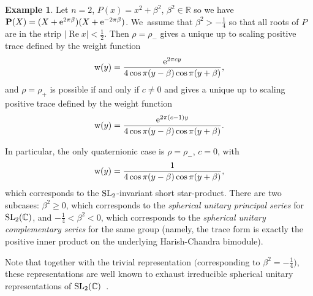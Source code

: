 \documentclass[pdftex]{sigma}
\renewcommand{\Re}{\operatorname{Re}}
\theoremstyle{definition}
\newtheorem{Example}[Theorem]{Example}
\numberwithin{equation}{section}
\begin{document}
\begin{Example}\label{neq2} Let $n=2$, $P(x)=x^2+\beta^2$, $\beta^2\in \mathbb R$ so we have $\mathbf{P}(X)=(X+{\rm e}^{2\pi\beta})(X+{\rm e}^{-2\pi\beta})$. We~assume that $\beta^2>-\frac{1}{4}$ so that all roots of $P$ are in the strip $|\Re x|<\frac12$. Then $\rho=\rho_-$ gives a unique up to scaling positive trace defined by the weight function
\[
{\rm w}(y)=\frac{{\rm e}^{2\pi cy}}{4\cos \pi(y-\beta)\cos \pi(y+\beta)},
\]
and $\rho=\rho_+$ is possible if and only if $c\ne 0$ and gives a unique up to scaling positive trace defined by the weight function
\[
{\rm w}(y)=\frac{{\rm e}^{2\pi(c-1)y}}{4\cos \pi(y-\beta)\cos \pi(y+\beta)}.
\]

In particular, the only quaternionic case is $\rho=\rho_-$, $c=0$, with
\[
{\rm w}(y)=\frac{1}{4\cos \pi(y-\beta)\cos \pi(y+\beta)},
\]
which corresponds to the ${\rm SL}_2$-invariant short star-product.
There are two subcases: $\beta^2\ge 0$, which corresponds to the
{\it spherical unitary principal series} for ${\rm SL}_2(\mathbb C)$, and
$-\frac{1}{4}<\beta^2<0$, which corresponds to the {\it spherical unitary complementary series} for the same group (namely, the trace form is exactly the positive inner product on the underlying Harish-Chandra bimodule).

Note that together with the trivial representation $\big($corresponding to $\beta^2=-\frac{1}{4}\big)$, these representations are well known to exhaust irreducible spherical unitary representations of ${\rm SL}_2(\mathbb C)$~\cite{V}.
\end{Example}
\end{document}
